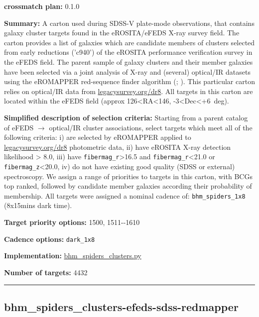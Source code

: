 \noindent\textbf{crossmatch plan:} 0.1.0

\noindent\textbf{Summary:} A carton used during SDSS-V plate-mode observations,
that contains galaxy cluster targets found in the eROSITA/eFEDS X-ray
survey field. The carton provides a list of galaxies which are candidate
members of clusters selected from early reductions ('c940') of the
eROSITA performance verification survey in the eFEDS field. The parent
sample of galaxy clusters and their member galaxies have been selected
via a joint analysis of X-ray and (several) optical/IR datasets using
the eROMAPPER red-sequence finder algorithm
(\citealt{Rykoff2014};
\citealt{IderChitham2020}). This particular carton relies on optical/IR data
from \href{https://www.legacysurvey.org/dr8/}{legacysurvey.org/dr8}. All
targets in this carton are located within the eFEDS field (approx
126\textless RA\textless146, -3\textless Dec\textless+6~deg).

\noindent\textbf{Simplified description of selection criteria:} Starting from a
parent catalog of eFEDS $\rightarrow$ optical/IR cluster associations, select
targets which meet all of the following criteria: i) are selected by
eROMAPPER applied to
\href{https://www.legacysurvey.org/dr8}{legacysurvey.org/dr8}
photometric data, ii) have eROSITA X-ray detection likelihood
\textgreater{} 8.0, iii) have \texttt{fibermag\_r}\textgreater16.5 and
\texttt{fibermag\_r}\textless21.0 or \texttt{fibermag\_z}\textless20.0,
iv) do not have existing good quality (SDSS or external) spectroscopy.
We assign a range of priorities to targets in this carton, with BCGs top
ranked, followed by candidate member galaxies according their
probability of membership. All targets were assigned a nominal cadence
of: \texttt{bhm\_spiders\_1x8} (8x15mins dark time).


\noindent\textbf{Target priority options:} 1500, 1511-\/-1610

\noindent\textbf{Cadence options:} \texttt{dark\_1x8}

\noindent\textbf{Implementation:}
\href{https://github.com/sdss/target_selection/blob/0.1.0/python/target_selection/cartons/bhm_spiders_clusters.py}{bhm\_spiders\_clusters.py}

\noindent\textbf{Number of targets:} 4432

\begin{center}\rule{0.5\linewidth}{0.5pt}\end{center}

\hypertarget{bhm_spiders_clusters-efeds-sdss-redmapper_plan0.1.0}{%
\subsection{bhm\_spiders\_clusters-efeds-sdss-redmapper}\label{bhm_spiders_clusters-efeds-sdss-redmapper_plan0.1.0}}

